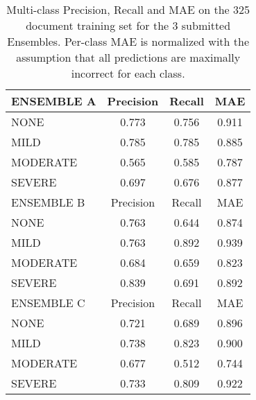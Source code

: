 \begin{table}
\centering
    \begin{tabular}{|l|c|c|c|}
    \hline
   \textsf{\cellcolor{gray!15} ENSEMBLE A} & \textsf{Precision} & \textsf{Recall} & \textsf{MAE} \\ 
   \hline
    \textsf{NONE} & 0.773 & 0.756 & \cellcolor{gray!15} 0.911 \\ 
    \textsf{MILD} & \cellcolor{gray!15} 0.785 & \cellcolor{gray!15} 0.785 & 0.885 \\ 
    \textsf{MODERATE} & 0.565 & 0.585 & 0.787 \\ 
    \textsf{SEVERE} & 0.697 & 0.676 & 0.877 \\ 
   \hline
   \textsf{\cellcolor{gray!15} ENSEMBLE B} & \textsf{Precision} & \textsf{Recall} & \textsf{MAE} \\ 
   \hline
    \textsf{NONE} & 0.763 & 0.644 & 0.874 \\ 
    \textsf{MILD} & 0.763 & \cellcolor{gray!15} 0.892 & \cellcolor{gray!15} 0.939 \\ 
    \textsf{MODERATE} & 0.684 & 0.659 & 0.823 \\ 
    \textsf{SEVERE} & \cellcolor{gray!15} 0.839 & 0.691 & 0.892 \\ 
   \hline
   \textsf{\cellcolor{gray!15} ENSEMBLE C} & \textsf{Precision} & \textsf{Recall} & \textsf{MAE} \\ 
   \hline
    \textsf{NONE} & 0.721 & 0.689 & 0.896 \\ 
    \textsf{MILD} & \cellcolor{gray!15} 0.738 & \cellcolor{gray!15}  0.823 & 0.900 \\ 
    \textsf{MODERATE} & 0.677 & 0.512 & 0.744 \\ 
    \textsf{SEVERE} & 0.733 & 0.809 & \cellcolor{gray!15} 0.922 \\ 
    \hline
    \end{tabular}
    \caption{Multi-class Precision, Recall and MAE on the 325 document training set for the 3 submitted Ensembles. Per-class MAE is normalized with the assumption that all predictions are maximally incorrect for each class.}
    \label{tab:EnsembleTrainingMetrics}
\end{table}

